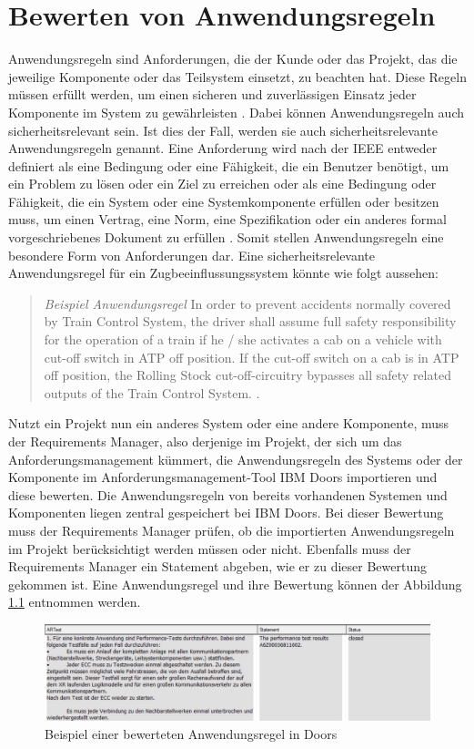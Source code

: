 \chapter{Bewerten von Anwendungsregeln}
\label{chap:kapitel2}

Anwendungsregeln sind Anforderungen, die der Kunde oder das Projekt, das die jeweilige Komponente oder das Teilsystem einsetzt, zu beachten hat. 
Diese Regeln müssen erfüllt werden, um einen sicheren und zuverlässigen Einsatz jeder Komponente im System zu gewährleisten \cite[S.9]{q2}. 
Dabei können Anwendungsregeln auch sicherheitsrelevant sein. Ist dies der Fall, werden sie auch sicherheitsrelevante Anwendungsregeln genannt. Eine Anforderung wird nach der 
IEEE entweder definiert als eine Bedingung oder eine Fähigkeit, die ein Benutzer benötigt, um ein Problem zu lösen oder ein Ziel zu erreichen oder als eine Bedingung oder Fähigkeit, 
die ein System oder eine Systemkomponente erfüllen oder besitzen muss, um einen Vertrag, eine Norm, eine Spezifikation oder ein anderes formal vorgeschriebenes Dokument 
zu erfüllen \cite[S.62]{q4}. Somit stellen Anwendungsregeln eine besondere Form von Anforderungen dar. Eine sicherheitsrelevante Anwendungsregel 
für ein Zugbeeinflussungssystem könnte wie folgt aussehen:

\begin{quotation}
	\textit{Beispiel Anwendungsregel} \glqq In order to prevent accidents normally covered by Train Control System, the driver shall assume full safety responsibility for the operation of a train if he / she activates a cab on a vehicle 
    with cut-off switch in \glqq ATP off\grqq{} position. If the cut-off switch on a cab is in \glqq ATP off\grqq{} position, the Rolling Stock cut-off-circuitry bypasses all safety related outputs of the 
    Train Control System.\grqq{} \cite[S.7]{q1}.
\end{quotation}

Nutzt ein Projekt nun ein anderes System oder eine andere Komponente, muss der Requirements Manager, also derjenige im Projekt, der sich um das Anforderungsmanagement kümmert, 
die Anwendungsregeln des Systems oder der Komponente im Anforderungsmanagement-Tool IBM Doors importieren und diese bewerten. Die Anwendungsregeln von bereits vorhandenen Systemen 
und Komponenten liegen zentral gespeichert bei IBM Doors. Bei dieser Bewertung muss der Requirements Manager prüfen, ob die importierten Anwendungsregeln im Projekt berücksichtigt 
werden müssen oder nicht. Ebenfalls muss der Requirements Manager ein Statement abgeben, wie er zu dieser Bewertung gekommen ist. Eine Anwendungsregel und ihre Bewertung können der 
Abbildung \ref*{fig:Bewertete Anwendungsregel} entnommen werden.

\begin{figure}[h]
    \centering
    \includegraphics[width = \textwidth]{abbildungen/Bewertete Anwendungsregel.PNG}
    \caption{Beispiel einer bewerteten Anwendungsregel in Doors}
    \label{fig:Bewertete Anwendungsregel}
\end{figure}
